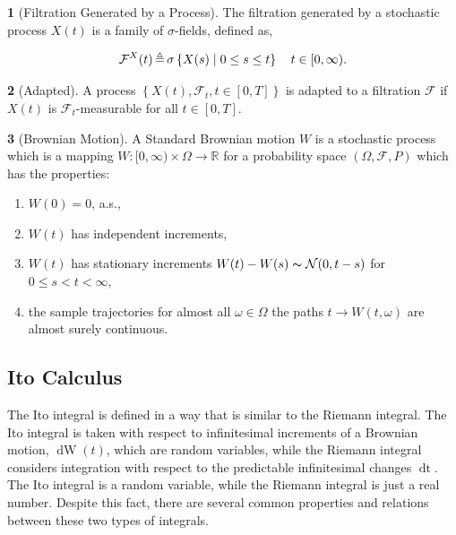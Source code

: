 \documentclass[british]{amsart} \usepackage{lmodern}
\numberwithin{equation}{section} \numberwithin{figure}{section}
\theoremstyle{plain} \newtheorem{thm}{\protect\theoremname}[section]
\theoremstyle{definition} \newtheorem{defn}[thm]{\protect\definitionname}
\theoremstyle{plain} \newtheorem{assumption}[thm]{\protect\assumptionname}
\theoremstyle{plain} \newtheorem{lem}[thm]{\protect\lemmaname}
\theoremstyle{plain} \newtheorem{prop}[thm]{\protect\propositionname}
\theoremstyle{remark} \newtheorem{rem}[thm]{\protect\remarkname}
\theoremstyle{plain} \newtheorem{cor}[thm]{\protect\corollaryname}
\renewcommand{\d}[1]{\mathop{\mathrm{d}{#1}}}
\newcommand{\defeq}{\mathop{\triangleq}} \newcommand{\almostsurely}{\text{a.s.}}
\begin{document}
\begin{defn} [Filtration Generated by a Process]
  The filtration generated by a stochastic process $X(t)$
  is a family of $\sigma$-fields, defined as, 
  
  \begin{equation}
    \mathcal{F}^{X}(t) \defeq \sigma \left\{ X(s) \mid 0 \le s \le t \right\} 
    \quad \ranget.
  \end{equation}

\end{defn}

\begin{defn} [Adapted]
  A process $\left\{ X(t),\mathcal{F}_{t},t\in[0,T]\right\} $ is adapted
  to a filtration $\mathcal{F}$ if $X(t)$ is $\mathcal{F}_{t}$-measurable
  for all $t\in[0,T]$. 
\end{defn}

\begin{defn} [Brownian Motion]
  A Standard Brownian motion $W$ is a stochastic process which
  is a mapping $W:[0,\infty)\times\Omega\to\mathbb{R}$ for a probability
  space $(\Omega,\mathcal{F},P)$ which has the properties:

  \begin{enumerate}
    \item $W(0)=0$, a.s.,
    \item $W(t)$ has independent increments,
    \item $W(t)$ has stationary increments $W(t)-W(s)\thicksim\mathcal{N}(0,t-s)$
          for $0\le s<t<\infty,$
    \item the sample trajectories for almost all $\omega\in\Omega$ the paths
          $t\to W(t,\omega)$ are almost surely continuous.
  \end{enumerate}
\end{defn}

\subsection{Ito Calculus}

The Ito integral is defined in a way that is similar to the Riemann integral.
The Ito integral is taken with respect to infinitesimal increments of a Brownian
motion, $\d{W}(t)$, which are random variables, while the Riemann integral
considers integration with respect to the predictable infinitesimal changes
$\d{t}$. The Ito integral is a random variable, while the Riemann integral is just
a real number. Despite this fact, there are several common properties and
relations between these two types of integrals.
\end{document}
